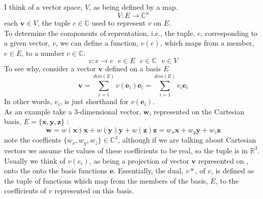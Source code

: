 \documentclass[12pt]{article}
\begin{document}
\noindent I think of a vector space, $V$, as being defined by a map.
\begin{equation}
V : E \rightarrow \mathbb{C}^{n}
\end{equation}
\noindent each $\mathbf{v} \in V$, the tuple $c\in \mathbb{C}$ used to represent
$v$ on $E$.\\

\noindent To determine the components of reprentation, i.e., the tuple, $c$, corresponding
to a given vector, $v$, we can define a function, $v(e)$,
which maps from a member, $e \in E$, to a number $c \in \mathbb{C}$.
\begin{equation}
v :  e \rightarrow c \text{ \  \  \ \ \ \ \ \ \ \ \ \ \ \ \ \ }  e\in E \text{ \ \ }c \in \mathbb{C} \text{\ \ \ } v \in V 
\end{equation}
\noindent To see why, consider a vector $\mathbf{v}$ defined on a basis $E$
\begin{equation}
\mathbf{v} = \sum_{i=1}^{dim(E)} v(\mathbf{e}_{i}) \mathbf{e}_{i} = \sum_{i=1}^{dim(E)} v_{i} \mathbf{e}_{i}
\end{equation}
\noindent In other words, $v_{i}$, is just shorthand for $v(\mathbf{e}_{i})$.\\

\noindent As an example take a 3-dimensional vector, $\mathbf{w}$, represented
on the Cartesian basis, $E = \{\mathbf{x},\mathbf{y},\mathbf{z}\}$ :
\begin{equation}
\mathbf{w} = w(\mathbf{x})\mathbf{x}+w(\mathbf{y})\mathbf{y}+w(\mathbf{z})\mathbf{z}
 = w_{x}\mathbf{x}+w_{y}\mathbf{y}+w_{z}\mathbf{z}
\end{equation}
\noindent note the coeffients $\{w_{x},w_{y},w_{z}\}\in \mathbb{C}^{3}$, although
if we are talking about Cartesian vectors we assume the values of these coefficients
to be real, so the tuple is in $\mathbb{R}^{3}$.\\

\noindent Usually we think of $v(e_{i})$, as being a projection of
vector $\mathbf{v}$ represented on , onto the onto the basis functions $\mathbf{e}$. 
Essentially, the dual, $v*$, of $v$, is defined as the tuple of functions which map 
from the members of the basis, $E$, to the coefficients of $v$ represented on this basis.\\
\end{document}
